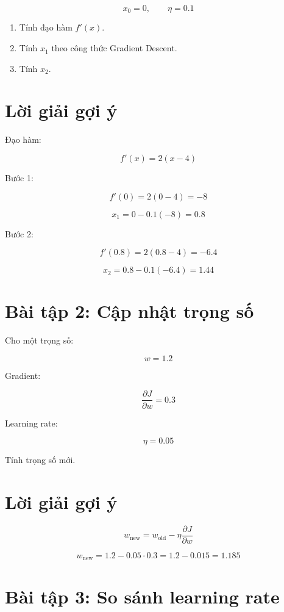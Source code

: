 \documentclass[12pt,a4paper]{report}
\begin{document}
\[
    x_0 = 0,\qquad \eta=0.1
\]

\begin{enumerate}
    \item Tính đạo hàm $f'(x)$.
    \item Tính $x_1$ theo công thức Gradient Descent.
    \item Tính $x_2$.
\end{enumerate}

\section*{Lời giải gợi ý}

Đạo hàm:

\[
    f'(x)=2(x-4)
\]

Bước 1:

\[
    f'(0)=2(0-4)=-8
\]

\[
    x_1=0-0.1(-8)=0.8
\]

Bước 2:

\[
    f'(0.8)=2(0.8-4)=-6.4
\]

\[
    x_2=0.8-0.1(-6.4)=1.44
\]

\section*{Bài tập 2: Cập nhật trọng số}

Cho một trọng số:

\[
    w=1.2
\]

Gradient:

\[
    \frac{\partial J}{\partial w}=0.3
\]

Learning rate:

\[
    \eta=0.05
\]

Tính trọng số mới.

\section*{Lời giải gợi ý}

\[
    w_{\text{new}}
    =
    w_{\text{old}}
    -
    \eta
    \frac{\partial J}{\partial w}
\]

\[
    w_{\text{new}}
    =
    1.2 - 0.05\cdot 0.3
    =
    1.2 - 0.015
    =
    1.185
\]

\section*{Bài tập 3: So sánh learning rate}
\end{document}
